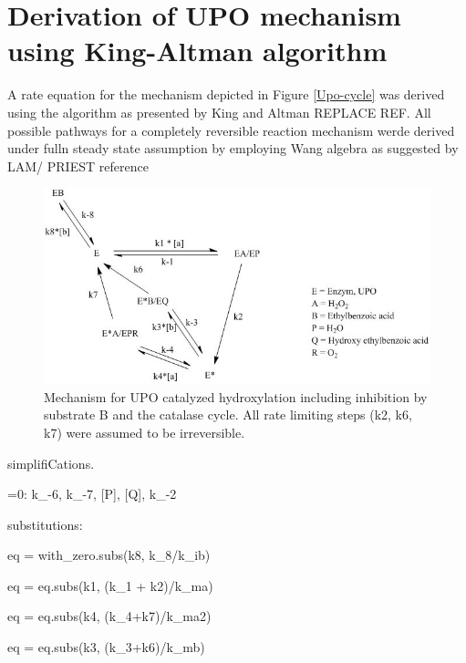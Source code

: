 \documentclass[12pt]{article}
\begin{document}
\section{Derivation of UPO mechanism using King-Altman algorithm}
A rate equation for the mechanism depicted in Figure \ref{Upo-cycle} was derived using the algorithm as presented by King and Altman REPLACE REF. All possible pathways for a completely reversible reaction mechanism werde derived under fulln steady state assumption by employing Wang algebra as suggested by LAM/ PRIEST reference

\begin{figure}[h]
\centering
\includegraphics[width=1\textwidth]{"PingPong Comp Inhib Katalase cycle"}
\caption{Mechanism for UPO catalyzed hydroxylation including inhibition by substrate B and the catalase cycle. All rate limiting steps (k2, k6, k7) were assumed to be irreversible.}
\end{figure}

simplifiCations.

=0: k_-6, k_-7, [P], [Q], k_-2


substitutions:

eq = with_zero.subs(k8, k_8/k_ib)

eq = eq.subs(k1, (k_1 + k2)/k_ma)

eq = eq.subs(k4, (k_4+k7)/k_ma2)

eq = eq.subs(k3, (k_3+k6)/k_mb)
\end{document}
